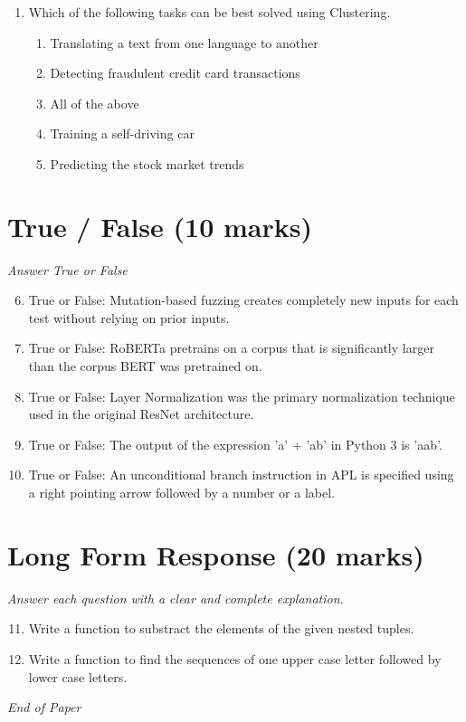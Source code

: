 \documentclass[12pt]{article}
\begin{document}
\begin{enumerate}[label=\arabic*.]
\begin{enumerate}[label=(\alph*)]
    \item 20
    \item 31
    \item 22
\end{enumerate}
\item Which of the following tasks can be best solved using Clustering.
\begin{enumerate}[label=(\alph*)]
    \item Translating a text from one language to another
    \item Detecting fraudulent credit card transactions
    \item All of the above
    \item Training a self-driving car
    \item Predicting the stock market trends
\end{enumerate}
\end{enumerate}

\section*{True / False (10 marks)}
\textit{Answer True or False}
\begin{enumerate}[label=\arabic*.]
\setcounter{enumi}{5}
\item True or False: Mutation-based fuzzing creates completely new inputs for each test without relying on prior inputs.
\item True or False: RoBERTa pretrains on a corpus that is significantly larger than the corpus BERT was pretrained on.
\item True or False: Layer Normalization was the primary normalization technique used in the original ResNet architecture.
\item True or False: The output of the expression 'a' + 'ab' in Python 3 is 'aab'.
\item True or False: An unconditional branch instruction in APL is specified using a right pointing arrow followed by a number or a label.
\end{enumerate}

\section*{Long Form Response (20 marks)}
\textit{Answer each question with a clear and complete explanation.}
\begin{enumerate}[label=\arabic*.]
\setcounter{enumi}{10}
\item Write a function to substract the elements of the given nested tuples.
\item Write a function to find the sequences of one upper case letter followed by lower case
letters.
\end{enumerate}

\vfill
\noindent\textit{End of Paper}
\end{document}
